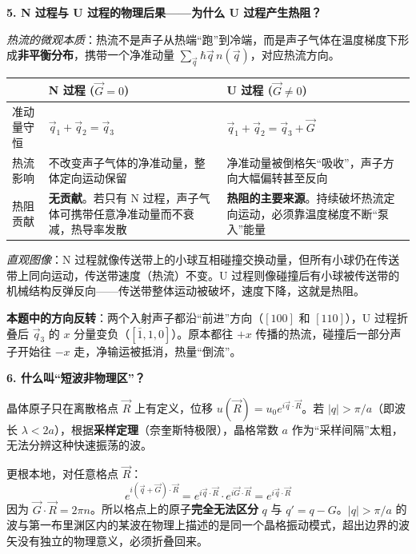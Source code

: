 \begin{insightbox}[物理图像与概念深化]
\textbf{5. N 过程与 U 过程的物理后果——为什么 U 过程产生热阻？}

\textit{热流的微观本质}：热流不是声子从热端``跑''到冷端，而是声子气体在温度梯度下形成\textbf{非平衡分布}，携带一个净准动量 $\sum_{\vec q}\hbar\vec q\,n(\vec q)$，对应热流方向。

\begin{center}
\begin{tabular}{p{2.5cm}p{5cm}p{5cm}}
\toprule
 & \textbf{N 过程} ($\vec G=0$) & \textbf{U 过程} ($\vec G\neq0$) \\
\midrule
准动量守恒 & $\vec q_1+\vec q_2=\vec q_3$ & $\vec q_1+\vec q_2=\vec q_3+\vec G$ \\
\addlinespace
热流影响 & 不改变声子气体的净准动量，整体定向运动保留 & 净准动量被倒格矢``吸收''，声子方向大幅偏转甚至反向 \\
\addlinespace
热阻贡献 & \textbf{无贡献}。若只有 N 过程，声子气体可携带任意净准动量而不衰减，热导率发散 & \textbf{热阻的主要来源}。持续破坏热流定向运动，必须靠温度梯度不断``泵入''能量 \\
\bottomrule
\end{tabular}
\end{center}

\textit{直观图像}：N 过程就像传送带上的小球互相碰撞交换动量，但所有小球仍在传送带上同向运动，传送带速度（热流）不变。U 过程则像碰撞后有小球被传送带的机械结构反弹反向——传送带整体运动被破坏，速度下降，这就是热阻。

\textbf{本题中的方向反转}：两个入射声子都沿``前进''方向（$[100]$ 和 $[110]$），U 过程折叠后 $\vec q_3$ 的 $x$ 分量变负（$[\bar1,1,0]$）。原本都往 $+x$ 传播的热流，碰撞后一部分声子开始往 $-x$ 走，净输运被抵消，热量``倒流''。

\textbf{6. 什么叫``短波非物理区''？}

晶体原子只在离散格点 $\vec R$ 上有定义，位移 $u(\vec R)=u_0 e^{i\vec q\cdot\vec R}$。若 $|q|>\pi/a$（即波长 $\lambda<2a$），根据\textbf{采样定理}（奈奎斯特极限），晶格常数 $a$ 作为``采样间隔''太粗，无法分辨这种快速振荡的波。

更根本地，对任意格点 $\vec R$：
\begin{equation}
e^{i(\vec q+\vec G)\cdot\vec R} = e^{i\vec q\cdot\vec R}\cdot e^{i\vec G\cdot\vec R} = e^{i\vec q\cdot\vec R}
\end{equation}
因为 $\vec G\cdot\vec R=2\pi n$。所以格点上的原子\textbf{完全无法区分} $q$ 与 $q'=q-G$。$|q|>\pi/a$ 的波与第一布里渊区内的某波在物理上描述的是同一个晶格振动模式，超出边界的波矢没有独立的物理意义，必须折叠回来。
\end{insightbox}

